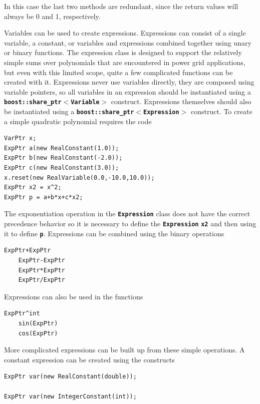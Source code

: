 \documentclass[12pt]{report} %
\begin{document}
In this case the last two methods are redundant, since the return values will always be 0 and 1, respectively.

Variables can be used to create expressions. Expressions can consist of a single variable, a constant, or variables and expressions combined together using unary or binary functions. The expression class is designed to support the relatively simple sums over polynomials that are encountered in power grid applications, but even with this limited scope, quite a few complicated functions can be created with it. Expressions never use variables directly, they are composed using variable pointers, so all variables in an expression should be instantiated using a \texttt{\textbf{boost::share\_ptr$\boldsymbol{\mathrm{<}}$Variable$\boldsymbol{\mathrm{>}}$}} construct. Expressions themselves should also be instantiated using a \texttt{\textbf{boost::share\_ptr$\boldsymbol{\mathrm{<}}$Expression$\boldsymbol{\mathrm{>}}$}} construct. To create a simple quadratic polynomial requires the code

{
\color{red}
\begin{Verbatim}[fontseries=b]
VarPtr x;
ExpPtr a(new RealConstant(1.0));
ExpPtr b(new RealConstant(-2.0));
ExpPtr c(new RealConstant(3.0));
x.reset(new RealVariable(0.0,-10.0,10.0));
ExpPtr x2 = x^2;
ExpPtr p = a+b*x+c*x2;
\end{Verbatim}
}

The exponentiation operation in the \texttt{\textbf{Expression}} class does not have the correct precedence behavior so it is necessary to define the \texttt{\textbf{Expression}} \texttt{\textbf{x2}} and then using it to define \texttt{\textbf{p}}. Expressions can be combined using the binary operations

{
\color{red}
\begin{Verbatim}[fontseries=b]
    ExpPtr+ExpPtr
    ExpPtr-ExpPtr
    ExpPtr*ExpPtr
    ExpPtr/ExpPtr
\end{Verbatim}
}

Expressions can also be used in the functions

{
\color{red}
\begin{Verbatim}[fontseries=b]
    ExpPtr^int
    sin(ExpPtr)
    cos(ExpPtr)
\end{Verbatim}
}

More complicated expressions can be built up from these simple operations. A constant expression can be created using the constructs

{
\color{red}
\begin{Verbatim}[fontseries=b]
ExpPtr var(new RealConstant(double));

ExpPtr var(new IntegerConstant(int));
\end{Verbatim}
}
\end{document}

